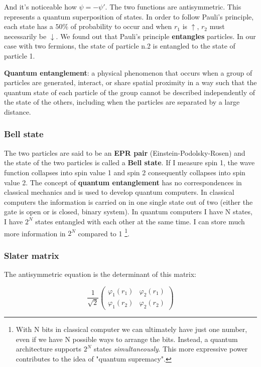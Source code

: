 		And it's noticeable how $\psi = -\psi'$.
		The two functions are antisymmetric.
		This represents a quantum superposition of states.
		In order to follow Pauli's principle, each state has a $50\%$ of probability to occur and when $r_1$ is $\uparrow$,  $r_2$ must necessarily be $\downarrow$.
		We found out that Pauli's principle \textbf{entangles} particles.
		In our case with two fermions, the state of particle n.2 is entangled to the state of particle 1.

		\begin{center}
		\textbf{Quantum entanglement}: a physical phenomenon that occurs when a group of particles are generated, interact, or share spatial proximity in a way such that the quantum state of each particle of the group cannot be described independently of the state of the others, including when the particles are separated by a large distance.
		\end{center}

		\subsubsection{Bell state}
		The two particles are said to be an \textbf{EPR pair} (Einstein-Podolsky-Rosen) and the state of the two particles is called a \textbf{Bell state}.
		If I measure spin 1, the wave function collapses into spin value 1 and spin 2 consequently collapses into spin value 2.
		The concept of \textbf{quantum entanglement} has no correspondences in classical mechanics and is used to develop quantum computers.
		In classical computers the information is carried on in one single state out of two (either the gate is open or is closed, binary system).
	In quantum computers I have N states, I have $2^N$ states entangled with each other at the same time.
	I can store much more information in $2^N$ compared to 1 \footnote{With N bits in classical computer we can ultimately have just one number, even if we have N possible ways to arrange the bits.
																																		Instead, a quantum architecture supports $2^N$ states \textit{simultaneously}.
																																		This more expressive power contributes to the idea of "quantum supremacy".}.

		\subsubsection{Slater matrix}
		The antisymmetric equation is the determinant of this matrix:

		$$\frac{1}{\sqrt{2}}\begin{pmatrix}\varphi_1(r_1)&\varphi_2(r_1)\\\varphi_1(r_2)&\varphi_2(r_2)\end{pmatrix}$$

